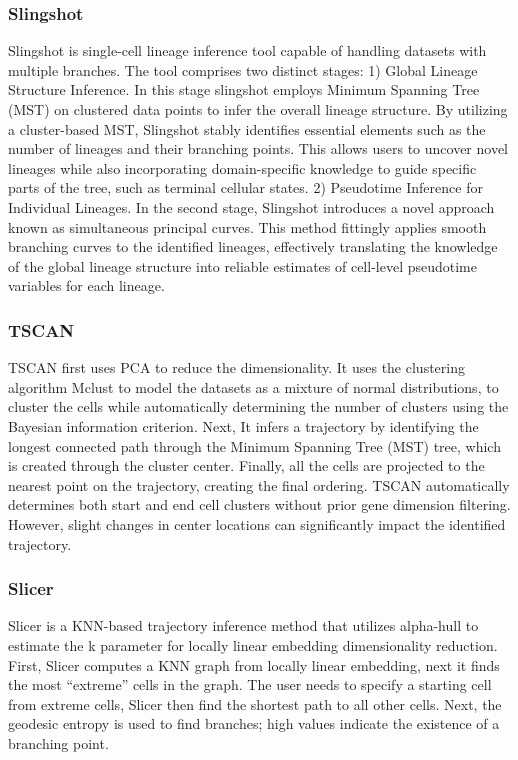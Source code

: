 \subsubsection{Slingshot}
Slingshot is single-cell lineage inference tool capable of handling datasets with multiple branches. The tool comprises two distinct stages: 1) Global Lineage Structure Inference. In this stage slingshot employs Minimum Spanning Tree (MST) on clustered data points to infer the overall lineage structure. By utilizing a cluster-based MST, Slingshot stably identifies essential elements such as the number of lineages and their branching points. This allows users to uncover novel lineages while also incorporating domain-specific knowledge to guide specific parts of the tree, such as terminal cellular states. 2) Pseudotime Inference for Individual Lineages. In the second stage, Slingshot introduces a novel approach known as simultaneous principal curves. This method fittingly applies smooth branching curves to the identified lineages, effectively translating the knowledge of the global lineage structure into reliable estimates of cell-level pseudotime variables for each lineage.
\subsubsection{TSCAN}
TSCAN first uses PCA to reduce the dimensionality. It uses the clustering algorithm Mclust to model the datasets as a mixture of normal distributions, to cluster the cells while automatically determining the number of clusters using the Bayesian information criterion. Next, It infers a trajectory by identifying the longest connected path through the Minimum Spanning Tree (MST) tree, which is created through the cluster center. Finally, all the cells are projected to the nearest point on the trajectory, creating the final ordering. TSCAN automatically determines both start and end cell clusters without prior gene dimension filtering. However, slight changes in center locations can significantly impact the identified trajectory.
\subsubsection{Slicer}
Slicer is a KNN-based trajectory inference method that utilizes alpha-hull to estimate the k parameter for locally linear embedding dimensionality reduction. First, Slicer computes a KNN graph from locally linear embedding, next it finds the most “extreme” cells in the graph. The user needs to specify a starting cell from extreme cells, Slicer then find the shortest path to all other cells. Next, the geodesic entropy is used to find branches; high values indicate the existence of a branching point.
